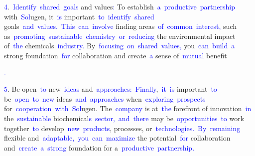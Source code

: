 \documentclass{article}
\begin{document}
\begin{tcolorbox}[colframe=black,colback=white]
{}\textcolor{blue}{4}.\textcolor{blue}{~Identify}\textcolor{blue}{~shared}\textcolor{blue}{~goals} and values\textcolor{blue}{:} To establish\textcolor{blue}{~a}\textcolor{blue}{~productive}\textcolor{blue}{~partnership} with\textcolor{blue}{~Sol}ugen, it\textcolor{blue}{~is} important\textcolor{blue}{~to}\textcolor{blue}{~identify}\textcolor{blue}{~shared} goals\textcolor{blue}{~and}\textcolor{blue}{~values}\textcolor{blue}{.}\textcolor{blue}{~This}\textcolor{blue}{~can}\textcolor{blue}{~involve} finding areas\textcolor{blue}{~of}\textcolor{blue}{~common}\textcolor{blue}{~interest}\textcolor{blue}{,} such as\textcolor{blue}{~promoting}\textcolor{blue}{~sustainable}\textcolor{blue}{~chemistry}\textcolor{blue}{~or}\textcolor{blue}{~reducing} the environmental impact of\textcolor{blue}{~the} chemicals\textcolor{blue}{~industry}\textcolor{blue}{.} By\textcolor{blue}{~focusing}\textcolor{blue}{~on}\textcolor{blue}{~shared}\textcolor{blue}{~values}\textcolor{blue}{,} you\textcolor{blue}{~can}\textcolor{blue}{~build}\textcolor{blue}{~a} strong foundation\textcolor{blue}{~for} collaboration and create\textcolor{blue}{~a} sense of\textcolor{blue}{~mutual} benefit\textcolor{blue}{.

}\textcolor{blue}{5}. Be open\textcolor{blue}{~to} new\textcolor{blue}{~ideas} and\textcolor{blue}{~approaches}\textcolor{blue}{:}\textcolor{blue}{~Finally},\textcolor{blue}{~it}\textcolor{blue}{~is} important\textcolor{blue}{~to} be\textcolor{blue}{~open}\textcolor{blue}{~to}\textcolor{blue}{~new} ideas\textcolor{blue}{~and}\textcolor{blue}{~approaches} when\textcolor{blue}{~exploring}\textcolor{blue}{~prospects} for\textcolor{blue}{~cooperation}\textcolor{blue}{~with}\textcolor{blue}{~Sol}ugen. The\textcolor{blue}{~company} is at\textcolor{blue}{~the} forefront of innovation\textcolor{blue}{~in} the\textcolor{blue}{~sustainable} biochemical\textcolor{blue}{s}\textcolor{blue}{~sector}\textcolor{blue}{,}\textcolor{blue}{~and}\textcolor{blue}{~there} may be\textcolor{blue}{~opportunities}\textcolor{blue}{~to} work together\textcolor{blue}{~to} develop\textcolor{blue}{~new}\textcolor{blue}{~products}, processes, or\textcolor{blue}{~technologies}\textcolor{blue}{.}\textcolor{blue}{~By}\textcolor{blue}{~remaining} flexible and\textcolor{blue}{~adaptable}\textcolor{blue}{,}\textcolor{blue}{~you}\textcolor{blue}{~can}\textcolor{blue}{~maximize} the potential\textcolor{blue}{~for} collaboration and\textcolor{blue}{~create}\textcolor{blue}{~a}\textcolor{blue}{~strong} foundation for a\textcolor{blue}{~productive}\textcolor{blue}{~partnership}\textcolor{blue}{.}\textcolor{blue}{}
\end{tcolorbox}
\end{document}
